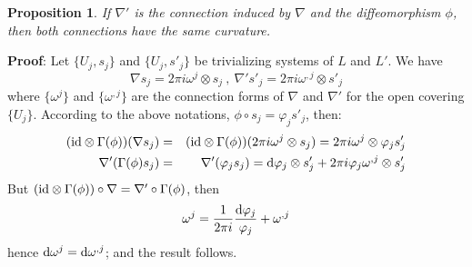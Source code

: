 \documentclass[12pt]{article}
\theoremstyle{plain}
\newtheorem{prop}{Proposition}
\def\beann{\begin{eqnarray*}}
\def\eeann{\end{eqnarray*}}
\def\qed{\ifvmode\removelastskip\fi
{\unskip\nobreak\hfil\penalty50\hbox{}\nobreak\hfil
\hbox{\vrule height1.2ex width1.2ex}\parfillskip=0pt
\finalhyphendemerits=0 \par\smallskip}}
\def\d{{\rm d}}
\begin{document}
\begin{prop}
If $\nabla '$ is the connection induced by
$\nabla$ and the diffeomorphism $\phi$,
then both connections have the same curvature.
\end{prop}
{\bf Proof}: 
Let $\{ U_j,s_j \}$ and $\{ U_j,s'_j \}$ be
trivializing systems of $L$ and $L'$.
We have
$$
\nabla s_j = 2\pi i \omega^j \otimes s_j
\ , \
\nabla ' s'_j = 2\pi i \omega^{,j} \otimes s'_j
$$
where $\{ \omega^j \}$ and $\{ \omega^{,j} \}$
are the connection forms of $\nabla$ and $\nabla '$
for the open covering $\{ U_j \}$.
According to the above notations,
$\phi \circ s_j = \varphi_j s'_j$,
then:
\beann
({\rm id}\otimes \Gamma (\phi))(\nabla s_j)
&=&
({\rm id}\otimes \Gamma (\phi))(2\pi i \omega^j \otimes s_j) =
2\pi i \omega^j \otimes \varphi_j s'_j
\\
\nabla '(\Gamma (\phi)s_j)
&=&
\nabla '(\varphi_j s_j) =
\d \varphi_j \otimes s'_j + 2\pi i \varphi_j \omega^{,j} \otimes s'_j
\eeann
 But $({\rm id}\otimes \Gamma (\phi)) \circ \nabla =
 \nabla '\circ \Gamma (\phi )$, then
$$
\omega^j = \frac{1}{2\pi i}\frac{\d \varphi_j}{\varphi_j} + \omega^{,j}
$$
hence $\d \omega^j = \d \omega^{,j}$; and the result follows.
\qed
\end{document}
